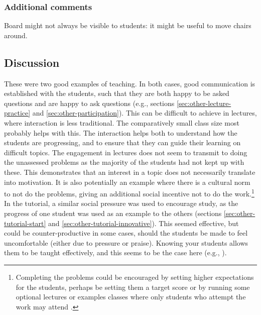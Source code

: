 \subsubsection{Additional comments}

Board might not always be visible to students: it might be useful to move chairs around.

\subsection{Discussion}\label{sec:other-discuss}

These were two good examples of teaching. In both cases, good communication is established with the students, such that they are both happy to be asked questions and are happy to ask questions (e.g., sections \ref{sec:other-lecture-practice} and \ref{sec:other-participation}). This can be difficult to achieve in lectures, where interaction is less traditional. The comparatively small class size most probably helps with this. The interaction helps both to understand how the students are progressing, and to ensure that they can guide their learning on difficult topics. The engagement in lectures does not seem to transmit to doing the unassessed problems as the majority of the students had not kept up with these. This demonstrates that an interest in a topic does not necessarily translate into motivation. It is also potentially an example where there is a cultural norm to not do the problems, giving an additional social incentive not to do the work.\footnote{Completing the problems could be encouraged by setting higher expectations for the students, perhaps be setting them a target score or by running some optional lectures or examples classes where only students who attempt the work may attend \citep[cf.][chapter 10, passports for seminars case study]{Jaques2007}.} In the tutorial, a similar social pressure was used to encourage study, as the progress of one student was used as an example to the others (sections \ref{sec:other-tutorial-start} and \ref{sec:other-tutorial-innovative}). This seemed effective, but could be counter-productive in some cases, should the students be made to feel uncomfortable (either due to pressure or praise). Knowing your students allows them to be taught effectively, and this seems to be the case here (e.g., ).

